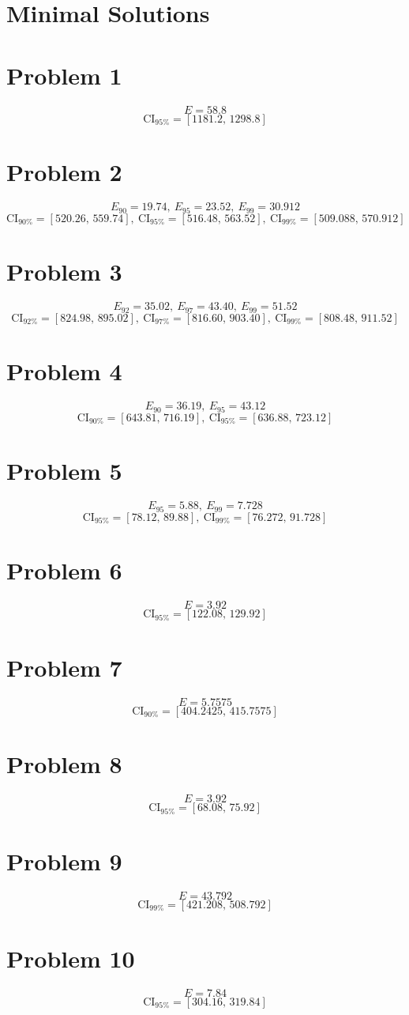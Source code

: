\section{Minimal Solutions}
\section{Problem 1}
\[
E=58.8
\]
\[
\text{CI}_{95\%}=[1181.2,\,1298.8]
\]

\section{Problem 2}
\[
E_{90}=19.74,\ E_{95}=23.52,\ E_{99}=30.912
\]
\[
\text{CI}_{90\%}=[520.26,\,559.74],\ \text{CI}_{95\%}=[516.48,\,563.52],\ \text{CI}_{99\%}=[509.088,\,570.912]
\]

\section{Problem 3}
\[
E_{92}=35.02,\ E_{97}=43.40,\ E_{99}=51.52
\]
\[
\text{CI}_{92\%}=[824.98,\,895.02],\ \text{CI}_{97\%}=[816.60,\,903.40],\ \text{CI}_{99\%}=[808.48,\,911.52]
\]

\section{Problem 4}
\[
E_{90}=36.19,\ E_{95}=43.12
\]
\[
\text{CI}_{90\%}=[643.81,\,716.19],\ \text{CI}_{95\%}=[636.88,\,723.12]
\]

\section{Problem 5}
\[
E_{95}=5.88,\ E_{99}=7.728
\]
\[
\text{CI}_{95\%}=[78.12,\,89.88],\ \text{CI}_{99\%}=[76.272,\,91.728]
\]

\section{Problem 6}
\[
E=3.92
\]
\[
\text{CI}_{95\%}=[122.08,\,129.92]
\]

\section{Problem 7}
\[
E=5.7575
\]
\[
\text{CI}_{90\%}=[404.2425,\,415.7575]
\]

\section{Problem 8}
\[
E=3.92
\]
\[
\text{CI}_{95\%}=[68.08,\,75.92]
\]

\section{Problem 9}
\[
E=43.792
\]
\[
\text{CI}_{99\%}=[421.208,\,508.792]
\]

\section{Problem 10}
\[
E=7.84
\]
\[
\text{CI}_{95\%}=[304.16,\,319.84]
\]


